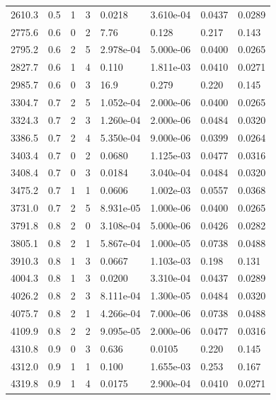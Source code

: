 \documentclass[preview]{standalone}
\begin{document}
{{{\begin{tabular}{L{1.2cm}C{1.2cm} C{0.3cm}C{0.5cm} C{1.4cm}C{1.4cm} C{1.4cm}C{1.4cm}}
  2610.3  &   0.5  & 1     &  3 &  0.0218  & 3.610e-04  & 0.0437 &  0.0289   \\ 
  2775.6  &   0.6  & 0     &  2 &  7.76  & 0.128  & 0.217 &  0.143   \\ 
  2795.2  &   0.6  & 2     &  5 &  2.978e-04  & 5.000e-06  & 0.0400 &  0.0265   \\ 
  2827.7  &   0.6  & 1     &  4 &  0.110  & 1.811e-03  & 0.0410 &  0.0271   \\ 
  2985.7  &   0.6  & 0     &  3 &  16.9  & 0.279  & 0.220 &  0.145   \\ 
  3304.7  &   0.7  & 2     &  5 &  1.052e-04  & 2.000e-06  & 0.0400 &  0.0265   \\ 
  3324.3  &   0.7  & 2     &  3 &  1.260e-04  & 2.000e-06  & 0.0484 &  0.0320   \\ 
  3386.5  &   0.7  & 2     &  4 &  5.350e-04  & 9.000e-06  & 0.0399 &  0.0264   \\ 
  3403.4  &   0.7  & 0     &  2 &  0.0680  & 1.125e-03  & 0.0477 &  0.0316   \\ 
  3408.4  &   0.7  & 0     &  3 &  0.0184  & 3.040e-04  & 0.0484 &  0.0320   \\ 
  3475.2  &   0.7  & 1     &  1 &  0.0606  & 1.002e-03  & 0.0557 &  0.0368   \\ 
  3731.0  &   0.7  & 2     &  5 &  8.931e-05  & 1.000e-06  & 0.0400 &  0.0265   \\ 
  3791.8  &   0.8  & 2     &  0 &  3.108e-04  & 5.000e-06  & 0.0426 &  0.0282   \\ 
  3805.1  &   0.8  & 2     &  1 &  5.867e-04  & 1.000e-05  & 0.0738 &  0.0488   \\ 
  3910.3  &   0.8  & 1     &  3 &  0.0667  & 1.103e-03  & 0.198 &  0.131   \\ 
  4004.3  &   0.8  & 1     &  3 &  0.0200  & 3.310e-04  & 0.0437 &  0.0289   \\ 
  4026.2  &   0.8  & 2     &  3 &  8.111e-04  & 1.300e-05  & 0.0484 &  0.0320   \\ 
  4075.7  &   0.8  & 2     &  1 &  4.266e-04  & 7.000e-06  & 0.0738 &  0.0488   \\ 
  4109.9  &   0.8  & 2     &  2 &  9.095e-05  & 2.000e-06  & 0.0477 &  0.0316   \\ 
  4310.8  &   0.9  & 0     &  3 &  0.636  & 0.0105  & 0.220 &  0.145   \\ 
  4312.0  &   0.9  & 1     &  1 &  0.100  & 1.655e-03  & 0.253 &  0.167   \\ 
  4319.8  &   0.9  & 1     &  4 &  0.0175  & 2.900e-04  & 0.0410 &  0.0271   \\ 

\end{tabular}}}}
\end{document}
